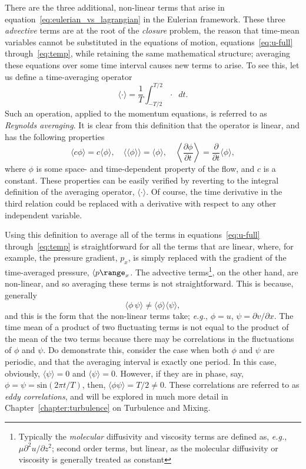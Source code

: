 \documentclass[11pt]{report}
\numberwithin{equation}{section}
\begin{document}
There are the three additional, non-linear terms that arise in equation~\ref{eq:eulerian_vs_lagrangian} in the Eulerian framework.  These three {\it advective} terms are at the root of the {\it closure} problem, the reason that time-mean variables cannot be substituted in the equations of motion, equations~\ref{eq:u-full} through~\ref{eq:temp}, while retaining the same mathematical structure; averaging these equations over some time interval causes new terms to arise.  To see this, let us define a time-averaging operator
\begin{equation}
    \langle\cdot\rangle = \frac{1}{T} \int^{T/2}_{-T/2} \cdot\;\;dt.
\end{equation}
Such an operation, applied to the momentum equations, is referred to as {\it Reynolds averaging}.  It is clear from this definition that the operator is linear, and has the following properties
\begin{equation}
    \langle c \phi\rangle = c \langle\phi\rangle, \quad \langle\langle\phi\rangle\rangle = \langle\phi\rangle, \quad \left\langle\frac{\partial \phi}{\partial t}\right\rangle = \frac{\partial}{\partial t}\langle\phi\rangle,
\end{equation}
where $\phi$ is some space- and time-dependent property of the flow, and $c$ is a constant.  These properties can be easily verified by reverting to the integral definition of the averaging operator, $\langle\cdot\rangle$. Of course, the time derivative in the third relation could be replaced with a derivative with respect to any other independent variable.  

Using this definition to average all of the terms in equations~\ref{eq:u-full} through~\ref{eq:temp} is straightforward for all the terms that are linear, where, for example, the pressure gradient, $p_x$, is simply replaced with the gradient of the time-averaged pressure, $\langle p \range_x$.  The advective terms\footnote{Typically the {\it molecular} diffusivity and viscosity terms are defined as, \emph{e.g.}, $\mu \partial^2 u/\partial z^2$; second order terms, but linear, as the molecular diffusivity or viscosity is generally treated as constant}, on the other hand, are non-linear, and so averaging these terms is not straightforward.  This is because, generally
\begin{equation}
    \langle\phi\,\psi\rangle \ne \langle\phi\rangle\langle\psi\rangle,
\end{equation}
and this is the form that the non-linear terms take; \emph{e.g.}, $\phi=u$, $\psi=\partial v/\partial x$.  The time mean of a product of two fluctuating terms is not equal to the product of the mean of the two terms because there may be correlations in the fluctuations of $\phi$ and $\psi$.  Do demonstrate this, consider the case when both $\phi$ and $\psi$ are periodic, and that the averaging interval is exactly one period.  In this case, obviously, $\langle\psi\rangle=0$ and $\langle\psi\rangle=0$.  However, if they are in phase, say, $\phi=\psi=\mathrm{sin}(2 \pi t / T)$, then, $\langle\phi \psi\rangle = T/2 \ne 0$.  These correlations are referred to as {\it eddy correlations}, and will be explored in much more detail in Chapter~\ref{chapter:turbulence} on Turbulence and Mixing.
\end{document}
